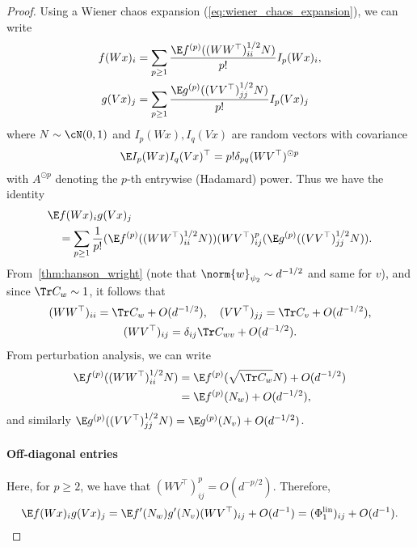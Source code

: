 \begin{proof}

Using a Wiener chaos expansion (\cref{eq:wiener_chaos_expansion}), we can write
\begin{equation}
    \begin{aligned}
    f(W x)_i &= \sum_{p\ge 1} \frac{\E f^{(p)}((W W^\top)_{ii}^{1/2} N) }{p!} I_p(Wx)_i,\\
    g(V x)_j &= \sum_{p\ge 1} \frac{\E g^{(p)}((V V^\top)_{jj}^{1/2} N) }{p!} I_p(Vx)_j
    \end{aligned}
\end{equation}
where \(N \sim \cN(0, 1)\) and $I_p(Wx),I_q(Vx)$ are random vectors with covariance
\begin{equation}
    \E I_p(Wx) I_q(Vx)^\top = p! \delta_{pq}  (W V^\top)^{\odot p}
\end{equation}
with $A^{\odot p}$ denoting the $p$-th entrywise (Hadamard) power. Thus we have the identity
\begin{equation}
    \begin{aligned}
    &\E f(Wx)_i g(Vx)_j \\
    &\quad = \sum_{p\geq 1} \frac{1}{p!} (\E f^{(p)}((W W^\top)_{ii}^{1/2} N) ) (W  V^\top )_{ij}^{p} ( \E g^{(p)}((V V^\top)_{jj}^{1/2} N) ).
    \end{aligned}
\end{equation}
From~\cref{thm:hanson_wright} (note that \(\norm{w}_{\psi_2} \sim d^{-1/2}\) and same for \(v\)), and since \(\Tr C_w  \sim 1\), it follows that 
\begin{gather}
        (W W^\top)_{ii} = \Tr C_w  + O(d^{-1/2}), \quad (V V^\top)_{jj} = \Tr C_{v} + O(d^{-1/2}), \\
        (W V^\top)_{ij} = \delta_{ij}\Tr C_{wv} + O(d^{-1/2}).
\end{gather}
From perturbation analysis, we can write
\begin{equation}
    \begin{aligned}
    \E f^{(p)}((W  W^{\top})_{ii}^{1/2} N) &= \E f^{(p)}(\sqrt{\Tr C_w } N) + O(d^{-1/2}) \\
    &= \E f^{(p)}(N_w) + O(d^{-1/2}),
    \end{aligned}
\end{equation}
and similarly \(\E g^{(p)}((V  V^{\top})_{jj}^{1/2} N) = \E g^{(p)}(N_v) + O(d^{-1/2})\).
\paragraph{Off-diagonal entries}
Here, for \(p \geq 2\), we have that \((W V^{\top})^p_{ij} = O(d^{-p/2})\).
Therefore, 
\begin{equation}
    \E f(Wx)_i g(Vx)_j = \E f'(N_w) g'(N_v) (W V^{\top})_{ij} + O(d^{-1}) = (\Phi_1^{\mathrm{lin}})_{ij} + O(d^{-1}).
\end{equation}

\end{proof}
